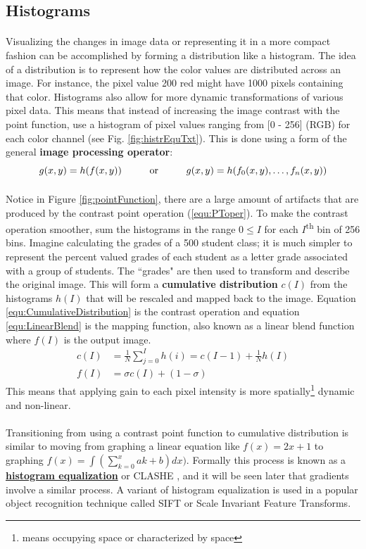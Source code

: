 \documentclass[11pt]{article}
\newcommand\simpleparagraph[1]{%
	\stepcounter{paragraph}\paragraph*{\theparagraph\quad{}#1}}
\renewcommand\theparagraph{}
\begin{document}
\subsection{Histograms}
\simpleparagraph{}
Visualizing the changes in image data or representing it in a more compact fashion can be accomplished by forming a distribution like a histogram. The idea of a distribution is to represent how the color values are distributed across an image. For instance, the pixel value 200 red might have 1000 pixels containing that color. Histograms also allow for more dynamic transformations of various pixel data. This means that instead of increasing the image contrast with the point function, use a histogram of pixel values ranging from [0 - 256] (RGB) for each color channel (see Fig. \ref{fig:histrEquTxt}). This is done using a form of the general \textbf{image processing operator}: 
\begin{equation}\label{equ:ProcOper}
g(x,y)=h(f(x,y))\text{\hspace{1cm}or\hspace{1cm}}g(x,y)=h(f_{0}(x,y),\dots,f_{n}(x,y))
\end{equation}
\paragraph[Cumulative Distribution]{}
Notice in Figure \ref{fig:pointFunction}, there are a large amount of artifacts \cite{contributors_distortion_2018} that are produced by the contrast point operation (\ref{equ:PToper}). To make the contrast operation smoother, sum the histograms in the range $0\leq I$ for each $I$\textsuperscript{th} bin of 256 bins. Imagine calculating the grades of a 500 student class; it is much simpler to represent the percent valued grades of each student as a letter grade associated with a group of students. The ``grades" are then used to transform and describe the original image. This will form a \textbf{cumulative distribution} $c(I)$ from the histograms $h(I)$ that will be rescaled and mapped back to the image. Equation \ref{equ:CumulativeDistribution} is the contrast operation and equation \ref{equ:LinearBlend} is the mapping function, also known as a linear blend function where $f(I)$ is the output image.
\begin{align}
c(I) &= \frac{1}{N} \sum_{j=0}^{I} h(i) = c(I-1) + \frac{1}{N}h(I) \label{equ:CumulativeDistribution} \\
f(I) &= \sigma c(I) + (1- \sigma) \label{equ:LinearBlend}
\end{align}
This means that applying gain to each pixel intensity is more spatially\footnote{means occupying space or characterized by space} dynamic and non-linear.
\simpleparagraph{}
Transitioning from using a contrast point function to cumulative distribution is similar to moving from graphing a linear equation like $f(x)=2x+1$ to graphing $f(x)=\int(\sum_{k=0}^{x}ak+b)dx)$. Formally this process is known as a \hyperref[fig:histrEquTxt]{\textbf{histogram equalization}} or CLASHE \cite{pizer_adaptive_1987}, and it will be seen later that gradients involve a similar process. A variant of histogram equalization is used in a popular object recognition technique called SIFT \cite[Lowe 2004]{lowe_distinctive_2004} or Scale Invariant Feature Transforms.
\end{document}
